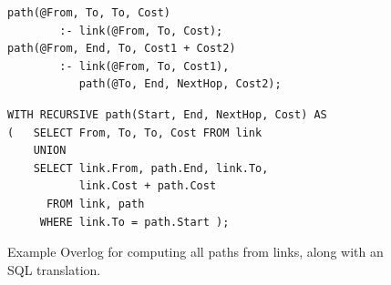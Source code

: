 \begin{figure}[t]
\begin{footnotesize}
\begin{verbatim}
path(@From, To, To, Cost) 
        :- link(@From, To, Cost);
path(@From, End, To, Cost1 + Cost2)
        :- link(@From, To, Cost1),
           path(@To, End, NextHop, Cost2);
\end{verbatim}
\end{footnotesize}
\begin{footnotesize}
\begin{verbatim}
WITH RECURSIVE path(Start, End, NextHop, Cost) AS
(   SELECT From, To, To, Cost FROM link
    UNION
    SELECT link.From, path.End, link.To,
           link.Cost + path.Cost
      FROM link, path
     WHERE link.To = path.Start );
\end{verbatim}
\end{footnotesize}
\vspace{-8pt}
\caption{Example Overlog for computing all paths from links, along with an SQL translation.}
\label{fig:datalogsql}
\end{figure}



